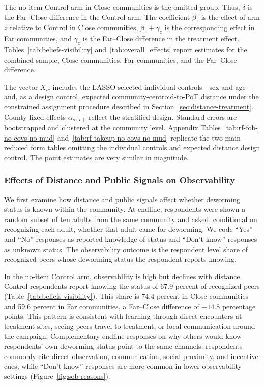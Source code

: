 \documentclass[ECM\space ReStud.tex]{subfiles}
\begin{document}
The no-item Control arm in Close communities is the omitted group. Thus, \(\delta\) is the Far--Close difference in the Control arm. The coefficient \(\beta_z\) is the effect of arm \(z\) relative to Control in Close communities, \(\beta_z+\gamma_z\) is the corresponding effect in Far communities, and \(\gamma_z\) is the Far--Close difference in the treatment effect. Tables~\ref{tab:beliefs-visibility} and~\ref{tab:overall_effects} report estimates for the combined sample, Close communities, Far communities, and the Far--Close difference.

The vector \(X_{ic}\) includes the LASSO-selected individual controls---sex and age---and, as a design control, expected community-centroid-to-PoT distance under the constrained assignment procedure described in Section~\ref{sec:distance-treatment}. County fixed effects \(\alpha_{s(c)}\) reflect the stratified design. Standard errors are bootstrapped and clustered at the community level. Appendix Tables~\ref{tab:rf-fob-no-covs-no-mud} and~\ref{tab:rf-takeup-no-covs-no-mud} replicate the two main reduced form tables omitting the individual controls and expected distance design control. The point estimates are very similar in magnitude.

\subsubsection{Effects of Distance and Public Signals on Observability}

We first examine how distance and public signals affect whether deworming status is known within the community. At endline, respondents were shown a random subset of ten adults from the same community and asked, conditional on recognizing each adult, whether that adult came for deworming. We code ``Yes'' and ``No'' responses as reported knowledge of status and ``Don't know'' responses as unknown status. The observability outcome is the respondent level share of recognized peers whose deworming status the respondent reports knowing.

In the no-item Control arm, observability is high but declines with distance. Control respondents report knowing the status of 67.9 percent of recognized peers (Table~\ref{tab:beliefs-visibility}). This share is 74.4 percent in Close communities and 59.6 percent in Far communities, a Far--Close difference of $-14.8$ percentage points. This pattern is consistent with learning through direct encounters at treatment sites, seeing peers travel to treatment, or local communication around the campaign. Complementary endline responses on why others would know respondents' own deworming status point to the same channels: respondents commonly cite direct observation, communication, social proximity, and incentive cues, while ``Don't know'' responses are more common in lower observability settings (Figure~\ref{fig:sob-reasons}).
\end{document}
